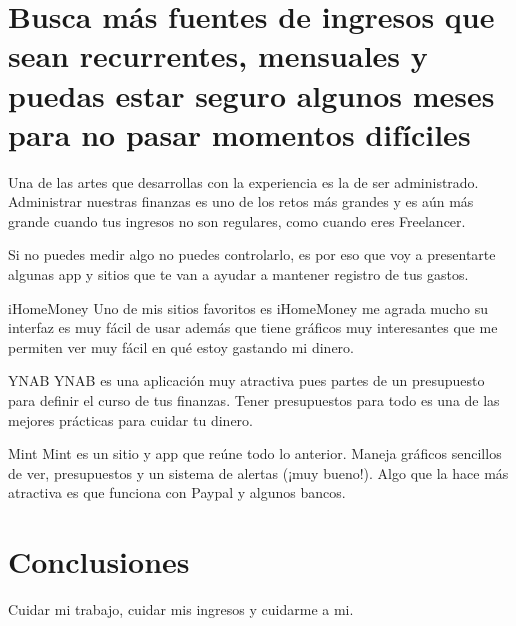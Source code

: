 \documentclass{article}
\begin{document}
\section{Busca más fuentes de ingresos que sean recurrentes, mensuales y puedas estar seguro algunos meses para no pasar momentos difíciles}

Una de las artes que desarrollas con la experiencia es la de ser administrado. Administrar nuestras finanzas es uno de los retos más grandes y es aún más grande cuando tus ingresos no son regulares, como cuando eres Freelancer.

Si no puedes medir algo no puedes controlarlo, es por eso que voy a presentarte algunas app y sitios que te van a ayudar a mantener registro de tus gastos.

iHomeMoney
Uno de mis sitios favoritos es iHomeMoney me agrada mucho su interfaz es muy fácil de usar además que tiene gráficos muy interesantes que me permiten ver muy fácil en qué estoy gastando mi dinero.

YNAB
YNAB es una aplicación muy atractiva pues partes de un presupuesto para definir el curso de tus finanzas. Tener presupuestos para todo es una de las mejores prácticas para cuidar tu dinero.

Mint
Mint es un sitio y app que reúne todo lo anterior. Maneja gráficos sencillos de ver, presupuestos y un sistema de alertas (¡muy bueno!). Algo que la hace más atractiva es que funciona con Paypal y algunos bancos.

\section{Conclusiones}
Cuidar mi trabajo, cuidar mis ingresos y cuidarme a mi.
\end{document}
